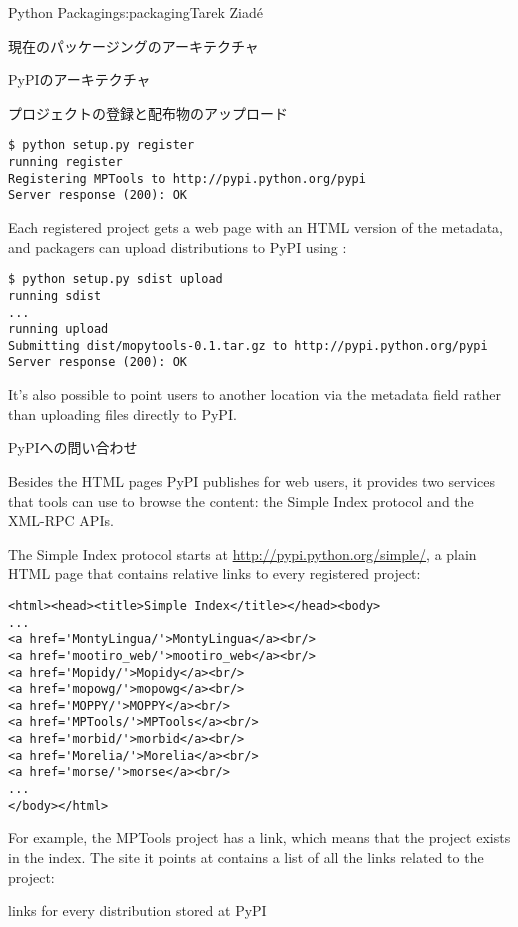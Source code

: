 \begin{aosachapter}{Python Packaging}{s:packaging}{Tarek Ziad\'{e}}
\begin{aosasect1}{現在のパッケージングのアーキテクチャ}
\begin{aosasect2}{PyPIのアーキテクチャ}
\begin{aosasect3}{プロジェクトの登録と配布物のアップロード}
\begin{verbatim}
$ python setup.py register
running register
Registering MPTools to http://pypi.python.org/pypi
Server response (200): OK
\end{verbatim}

\noindent Each registered project gets a web page with an HTML version of the
metadata, and packagers can upload distributions to PyPI using
:

\begin{verbatim}
$ python setup.py sdist upload
running sdist
...
running upload
Submitting dist/mopytools-0.1.tar.gz to http://pypi.python.org/pypi
Server response (200): OK
\end{verbatim}

It's also possible to point users to another location via the
 metadata field rather than uploading files directly to PyPI.

\end{aosasect3}

\begin{aosasect3}{PyPIへの問い合わせ}

Besides the HTML pages PyPI publishes for web users, it provides two
services that tools can use to browse the content: the Simple Index
protocol and the XML-RPC APIs.

The Simple Index protocol starts at
\url{http://pypi.python.org/simple/}, a plain HTML page that contains
relative links to every registered project:

\begin{verbatim}
<html><head><title>Simple Index</title></head><body>
...
<a href='MontyLingua/'>MontyLingua</a><br/>
<a href='mootiro_web/'>mootiro_web</a><br/>
<a href='Mopidy/'>Mopidy</a><br/>
<a href='mopowg/'>mopowg</a><br/>
<a href='MOPPY/'>MOPPY</a><br/>
<a href='MPTools/'>MPTools</a><br/>
<a href='morbid/'>morbid</a><br/>
<a href='Morelia/'>Morelia</a><br/>
<a href='morse/'>morse</a><br/>
...
</body></html>
\end{verbatim}

\noindent For example, the MPTools project has a  link, which
means that the project exists in the index.  The site it points at
contains a list of all the links related to the project:

\begin{aosaitemize}

  \item links for every distribution stored at PyPI


\end{aosaitemize}
\end{aosasect3}
\end{aosasect2}
\end{aosasect1}
\end{aosachapter}
